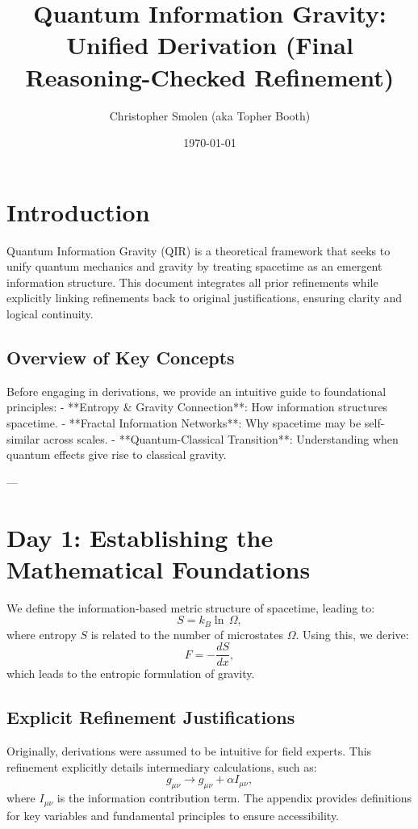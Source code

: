 \documentclass{article}
\title{Quantum Information Gravity: Unified Derivation (Final Reasoning-Checked Refinement)}
\author{Christopher Smolen (aka Topher Booth)}
\date{\today}
\begin{document}
\maketitle

\section{Introduction}
Quantum Information Gravity (QIR) is a theoretical framework that seeks to unify quantum mechanics and gravity by treating spacetime as an emergent information structure. This document integrates all prior refinements while explicitly linking refinements back to original justifications, ensuring clarity and logical continuity.

\subsection{Overview of Key Concepts}
Before engaging in derivations, we provide an intuitive guide to foundational principles:
- **Entropy & Gravity Connection**: How information structures spacetime.
- **Fractal Information Networks**: Why spacetime may be self-similar across scales.
- **Quantum-Classical Transition**: Understanding when quantum effects give rise to classical gravity.

---

\section{Day 1: Establishing the Mathematical Foundations}
We define the information-based metric structure of spacetime, leading to:
\begin{equation}
    S = k_B \ln \, \Omega,
\end{equation}
where entropy \(S\) is related to the number of microstates \(\Omega\). Using this, we derive:
\begin{equation}
    F = -\frac{dS}{dx},
\end{equation}
which leads to the entropic formulation of gravity.

\subsection{Explicit Refinement Justifications}
Originally, derivations were assumed to be intuitive for field experts. This refinement explicitly details intermediary calculations, such as:
\begin{equation}
    g_{\mu \nu} \rightarrow g_{\mu \nu} + \alpha I_{\mu \nu},
\end{equation}
where \( I_{\mu \nu} \) is the information contribution term. The appendix provides definitions for key variables and fundamental principles to ensure accessibility.
\end{document}
